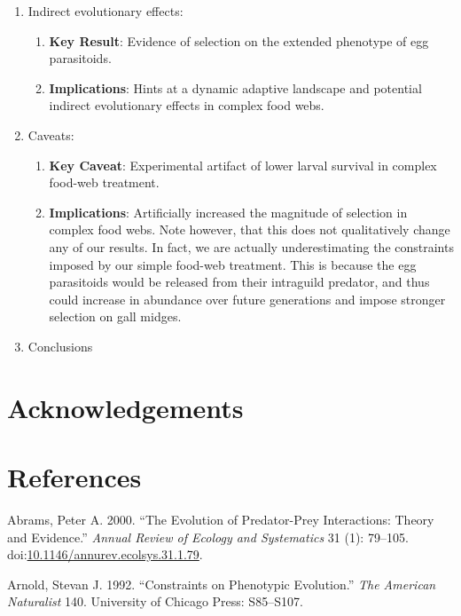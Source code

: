 \documentclass[11pt,]{article}
\begin{document}
\begin{enumerate}
 \item Indirect evolutionary effects:
    \begin{enumerate}
    \item \textbf{Key Result}: Evidence of selection on the extended phenotype of egg parasitoids.
    \item \textbf{Implications}: Hints at a dynamic adaptive landscape and potential indirect evolutionary effects in complex food webs.
    \end{enumerate}
    
 \item Caveats: 
    \begin{enumerate} 
    \item \textbf{Key Caveat}: Experimental artifact of lower larval survival in complex food-web treatment.
    \item \textbf{Implications}: Artificially increased the magnitude of selection in complex food webs. Note however, that this does not qualitatively change any of our results. In fact, we are actually underestimating the constraints imposed by our simple food-web treatment. This is because the egg parasitoids would be released from their intraguild predator, and thus could increase in abundance over future generations and impose stronger selection on gall midges. 
    \end{enumerate}

\item Conclusions

\end{enumerate}

\section{Acknowledgements}\label{acknowledgements}

\section{References}\label{references}

\hypertarget{refs}{}
\hypertarget{ref-Abrams2000}{}
Abrams, Peter A. 2000. ``The Evolution of Predator-Prey Interactions:
Theory and Evidence.'' \emph{Annual Review of Ecology and Systematics}
31 (1): 79--105.
doi:\href{https://doi.org/10.1146/annurev.ecolsys.31.1.79}{10.1146/annurev.ecolsys.31.1.79}.

\hypertarget{ref-Arnold1992}{}
Arnold, Stevan J. 1992. ``Constraints on Phenotypic Evolution.''
\emph{The American Naturalist} 140. University of Chicago Press:
S85--S107.
\end{document}
